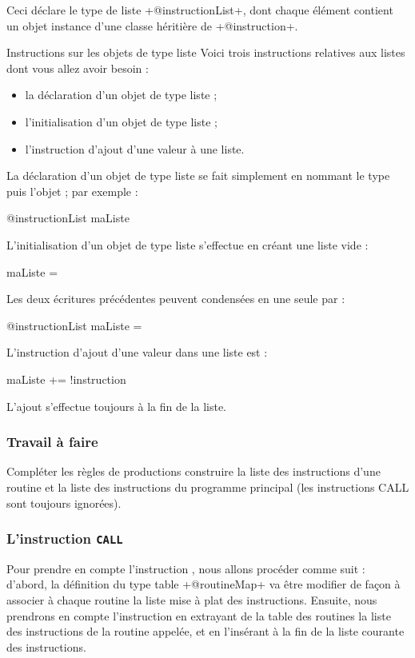 Ceci déclare le type de liste \ggs+@instructionList+, dont chaque élément contient un objet instance d'une classe héritière de \ggs+@instruction+.

Instructions sur les objets de type liste
Voici trois instructions relatives aux listes dont vous allez avoir besoin :
\begin{itemize}
  \item la déclaration d'un objet de type liste ;
  \item l'initialisation d'un objet de type liste ;
  \item l'instruction d'ajout d'une valeur à une liste.
\end{itemize}

La déclaration d'un objet de type liste se fait simplement en nommant le type puis l'objet ; par exemple :
\begin{galgas}
@instructionList maListe
\end{galgas}

L'initialisation d'un objet de type liste s'effectue en créant une liste vide :
\begin{galgas}
maListe = {}
\end{galgas}

Les deux écritures précédentes peuvent condensées en une seule par :
\begin{galgas}
@instructionList maListe = {}
\end{galgas}

L'instruction d'ajout d'une valeur dans une liste est :
\begin{galgas}
maListe += !instruction
\end{galgas}
L'ajout s'effectue toujours à la fin de la liste.

\subsubsection{Travail à faire}
Compléter les règles de productions construire la liste des instructions d'une routine et la liste des instructions du programme principal (les instructions CALL sont toujours ignorées).

\subsubsection{L'instruction \texttt{CALL}}
Pour prendre en compte l’instruction , nous allons procéder comme suit : d’abord, la définition du type table \ggs+@routineMap+ va être modifier de façon à associer à chaque routine la liste mise à plat des instructions. Ensuite, nous prendrons en compte l’instruction  en extrayant de la table des routines la liste des instructions de la routine appelée, et en l’insérant à la fin de la liste courante des instructions.

